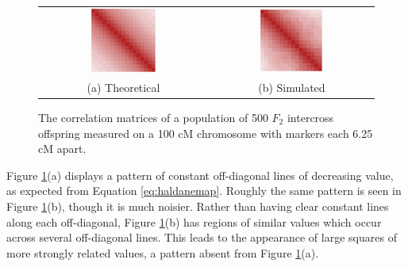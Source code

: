 \documentclass{article}
\begin{document}
\begin{figure}[htp]
  \begin{center}
    \begin{tabular}{cc}
      \includegraphics[width = 0.4\textwidth]{./img/chevSimTheory.png} &
      \includegraphics[width = 0.4\textwidth]{./img/chevSim.png} \\
      {\footnotesize (a) Theoretical} &
      {\footnotesize (b) Simulated} \\
    \end{tabular}
  \end{center}
  \caption{The correlation matrices of a population of 500 $F_2$ intercross offspring measured on a 100 cM chromosome with markers each 6.25 cM apart.}
  \label{fig:chevSims}
\end{figure}

Figure \ref{fig:chevSims}(a) displays a pattern of constant off-diagonal lines of decreasing value, as expected from Equation \ref{eq:haldanemap}. Roughly the same pattern is seen in Figure \ref{fig:chevSims}(b), though it is much noisier. Rather than having clear constant lines along each off-diagonal, Figure \ref{fig:chevSims}(b) has regions of similar values which occur across several off-diagonal lines. This leads to the appearance of large squares of more strongly related values, a pattern absent from Figure \ref{fig:chevSims}(a).
\end{document}
